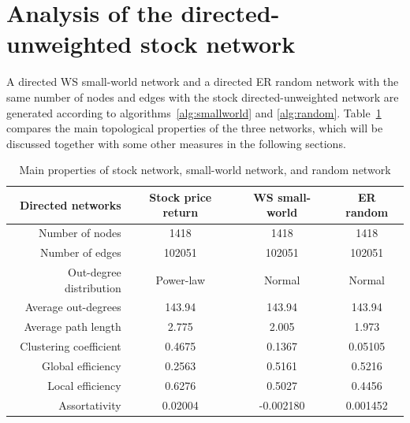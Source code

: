 \section{Analysis of the directed-unweighted stock network}
A directed WS small-world network and a directed ER random network with the same number of nodes and edges with the stock directed-unweighted network are generated according to algorithms~\ref{alg:smallworld} and \ref{alg:random}. Table~\ref{tab:three} compares the main topological properties of the three networks, which will be discussed together with some other measures in the following sections.

\begin{table}
	\begin{center}
		\begin{tabular}{r|c|c|c}\hline\hline
			\textbf{Directed networks}&\textbf{Stock price return}&\textbf{WS small-world}&\textbf{ER random}\\\hline
			Number of nodes&1418&1418&1418\\
			Number of edges&102051&102051&102051\\
			Out-degree distribution&Power-law&Normal&Normal\\
			Average out-degrees&143.94&143.94&143.94\\
			Average path length&2.775&2.005&1.973\\
			Clustering coefficient&0.4675&0.1367&0.05105\\
			Global efficiency&0.2563&0.5161&0.5216\\
			Local efficiency&0.6276&0.5027&0.4456\\
			Assortativity&0.02004&-0.002180&0.001452\\
			\hline\hline
		\end{tabular}
	\end{center}
	\caption{Main properties of stock network, small-world network, and random network}\label{tab:three}
\end{table}

